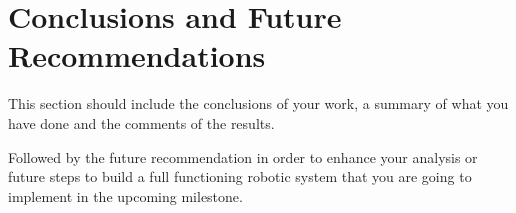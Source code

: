 \section{Conclusions and Future Recommendations}\label{sec5}
This section should include the conclusions of your work, a summary of what you have done and the comments of the results.

Followed by the future recommendation in order to enhance your analysis or future steps to build a full functioning robotic system that you are going to implement in the upcoming milestone.
